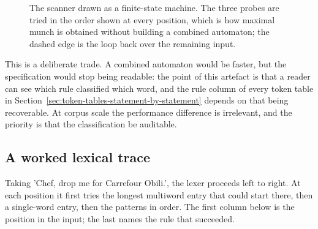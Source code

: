 \documentclass[11pt,a4paper]{article}
\begin{document}
\begin{figure}[!htbp]
\caption{The scanner drawn as a finite-state machine. The three probes are tried in the order shown at every position, which is how maximal munch is obtained without building a combined automaton; the dashed edge is the loop back over the remaining input.}
\label{fig:lexer-automaton}
\end{figure}

This is a deliberate trade. A combined automaton would be faster, but the specification would stop being readable: the point of this artefact is that a reader can see which rule classified which word, and the rule column of every token table in Section~\ref{sec:token-tables-statement-by-statement} depends on that being recoverable. At corpus scale the performance difference is irrelevant, and the priority is that the classification be auditable.

\subsection{A worked lexical trace}
Taking 'Chef, drop me for Carrefour Obili.', the lexer proceeds left to right. At each position it first tries the longest multiword entry that could start there, then a single-word entry, then the patterns in order. The first column below is the position in the input; the last names the rule that succeeded.
\end{document}
